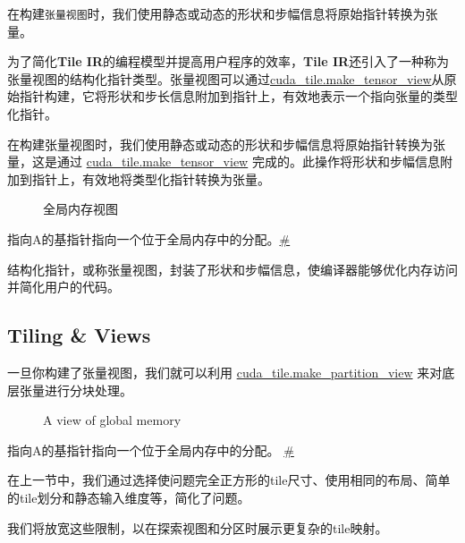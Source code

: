 \documentclass{article}
\begin{document}
在构建\texttt{张量视图}时，我们使用静态或动态的形状和步幅信息将原始指针转换为张量。


为了简化\textbf{Tile IR}的编程模型并提高用户程序的效率，\textbf{Tile IR}还引入了一种称为张量视图的结构化指针类型。张量视图可以通过\href{https://docs.nvidia.com/cuda/tile-ir/latest/sections/operations.html#op-cuda-tile-make-tensor-view}{cuda\_tile.make\_tensor\_view}从原始指针构建，它将形状和步长信息附加到指针上，有效地表示一个指向张量的类型化指针。


在构建张量视图时，我们使用静态或动态的形状和步幅信息将原始指针转换为张量，这是通过 \href{https://docs.nvidia.com/cuda/tile-ir/latest/sections/operations.html#op-cuda-tile-make-tensor-view}{cuda\_tile.make\_tensor\_view} 完成的。此操作将形状和步幅信息附加到指针上，有效地将类型化指针转换为张量。


\begin{figure}[!ht]\centering

\caption{全局内存视图}
\end{figure}
指向A的基指针指向一个位于全局内存中的分配。\href{https://docs.nvidia.com/cuda/tile-ir/latest/sections/prog_model.html#id2}{\#}



结构化指针，或称张量视图，封装了形状和步幅信息，使编译器能够优化内存访问并简化用户的代码。



\subsection{Tiling \& Views}

一旦你构建了张量视图，我们就可以利用 \href{https://docs.nvidia.com/cuda/tile-ir/latest/sections/operations.html#op-cuda-tile-make-partition-view}{cuda\_tile.make\_partition\_view} 来对底层张量进行分块处理。


\begin{figure}[!ht]\centering

\caption{A view of global memory}
\end{figure}
指向A的基指针指向一个位于全局内存中的分配。 \href{https://docs.nvidia.com/cuda/tile-ir/latest/sections/prog_model.html#id3}{\#}



在上一节中，我们通过选择使问题完全正方形的tile尺寸、使用相同的布局、简单的tile划分和静态输入维度等，简化了问题。

我们将放宽这些限制，以在探索视图和分区时展示更复杂的tile映射。
\end{document}
